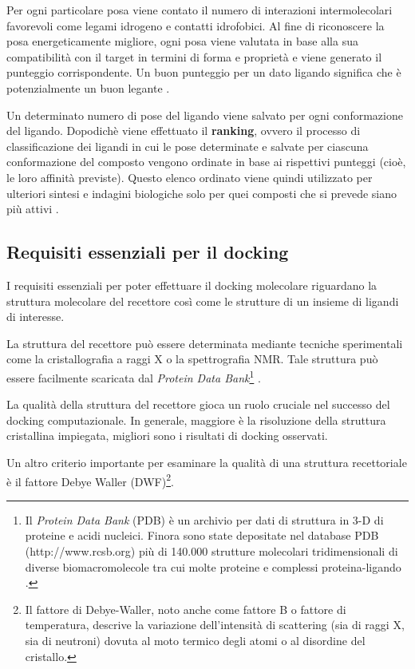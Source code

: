 Per ogni particolare posa viene contato il numero di interazioni intermolecolari favorevoli come legami idrogeno e contatti idrofobici. 
Al fine di riconoscere la posa energeticamente migliore, ogni posa viene valutata in base alla sua compatibilità con il target in termini di forma e proprietà e viene generato il punteggio corrispondente. Un buon punteggio per un dato ligando significa che è potenzialmente un buon legante \cite{roy_chapter_2015}.

Un determinato numero di pose del ligando viene salvato per ogni conformazione del ligando. Dopodichè viene effettuato il \textbf{ranking}, ovvero il processo di classificazione dei ligandi in cui le pose determinate e salvate per ciascuna conformazione del composto vengono ordinate in base ai rispettivi punteggi (cioè, le loro affinità previste).  Questo elenco ordinato viene quindi utilizzato per ulteriori sintesi e indagini biologiche solo per quei composti che si prevede siano più attivi \cite{roy_chapter_2015}.


\subsection{Requisiti essenziali per il docking} \label{requirements}
I requisiti essenziali per poter effettuare il docking molecolare riguardano la struttura molecolare del recettore così come le strutture di un insieme di ligandi di interesse.

La struttura del recettore può essere determinata mediante tecniche sperimentali come la cristallografia a raggi X o la spettrografia NMR. Tale struttura può essere facilmente scaricata dal \textit{Protein Data Bank}\footnote{Il \textit{Protein Data Bank} (PDB) è un archivio per dati di struttura in 3-D di proteine e acidi nucleici. Finora sono state depositate nel database PDB (http://www.rcsb.org) più di 140.000 strutture molecolari tridimensionali di diverse biomacromolecole tra cui molte proteine e complessi proteina-ligando \cite{naqvi_advancements_nodate}.} \cite{roy_chapter_2015}. 

La qualità della struttura del recettore gioca un ruolo cruciale nel successo del docking computazionale. In generale, maggiore è la risoluzione della struttura cristallina impiegata, migliori sono i risultati di docking osservati.

Un altro criterio importante per esaminare la qualità di una struttura recettoriale è il fattore Debye Waller (DWF)\footnote{Il fattore di Debye-Waller, noto anche come fattore B o fattore di temperatura, descrive la variazione dell'intensità di scattering (sia di raggi X, sia di neutroni) dovuta al moto termico degli atomi o al disordine del cristallo.}.


